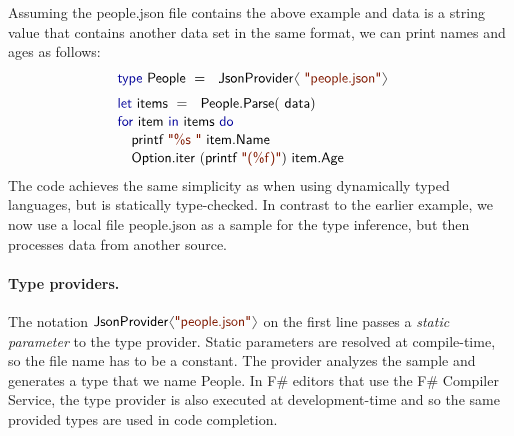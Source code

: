\documentclass[preprint]{sigplanconf}
\newcommand{\langl}{\begin{picture}(4.5,7)
\put(1.1,2.5){\rotatebox{60}{\line(1,0){5.5}}}
\put(1.1,2.5){\rotatebox{300}{\line(1,0){5.5}}}
\end{picture}}
\newcommand{\rangl}{\begin{picture}(4.5,7)
\put(.9,2.5){\rotatebox{120}{\line(1,0){5.5}}}
\put(.9,2.5){\rotatebox{240}{\line(1,0){5.5}}}
\end{picture}}
\newcommand{\kvd}[1]{\textnormal{\textcolor{kvdclr}{\sffamily #1}}}
\newcommand{\str}[1]{\textnormal{\textcolor{strclr}{\sffamily "#1"}}}
\newcommand{\strf}[1]{\textnormal{\textcolor{strclr}{\sffamily #1}}}
\newcommand{\ident}[1]{\textnormal{\sffamily #1}}
\begin{document}
Assuming the \strf{people.json} file contains the above example and \ident{data} is a string value
that contains another data set in the same format, we can print names and ages as follows:
%
\begin{equation*}
\begin{array}{l}
 \kvd{type}~\ident{People}~=~\ident{JsonProvider}\langl\str{people.json}\rangl\hspace{1em} \\[0.6em]
 \kvd{let}~\ident{items}~=~\ident{People.Parse}(\ident{data})\\[0.1em]
 \kvd{for}~\ident{item}~\kvd{in}~\ident{items}~\kvd{do}\\[0.1em]
 \quad\ident{printf}~\str{\%s }~\ident{item.Name}\\[0.1em]
 \quad\ident{Option.iter}~(\ident{printf}~\str{(\%f)})~\ident{item.Age}
\end{array}
\end{equation*}
%
The code achieves the same simplicity as when using dynamically typed languages, but is statically 
type-checked. In contrast to the earlier example, we now use a local file \strf{people.json} as a 
sample for the type inference, but then processes data from another source. 

\paragraph{Type providers.}
The notation $\ident{JsonProvider}\langl\str{people.json}\rangl$ on the first line passes a 
\emph{static parameter} to the type provider. Static parameters are resolved at compile-time, 
so the file name has to be a constant. The provider analyzes the sample and generates
a type that we name \ident{People}. In F\# editors that use the F\# Compiler Service, the 
type provider is also executed at development-time and so the same provided types are
used in code completion.
\end{document}
